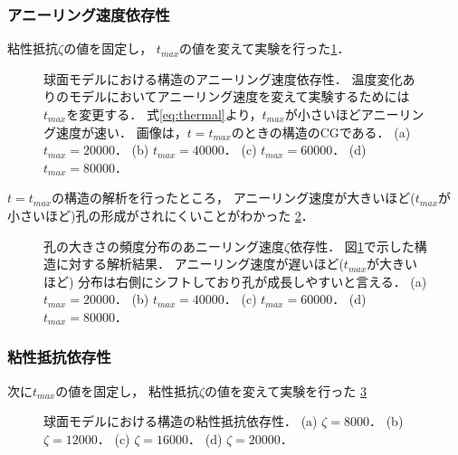\subsubsection{アニーリング速度依存性}

粘性抵抗$\zeta$の値を固定し，
$t_{max}$の値を変えて実験を行った\ref{fig:result_sphere_anearing_speed}．

\begin{figure}
\centering

\caption{
    球面モデルにおける構造のアニーリング速度依存性．
    温度変化ありのモデルにおいてアニーリング速度を変えて実験するためには$t_{max}$を変更する．
    式\ref{eq:thermal}より，$t_{max}$が小さいほどアニーリング速度が速い．
    画像は，$t=t_{max}$のときの構造のCGである．
    (a) $t_{max}=20000$．
    (b) $t_{max}=40000$．
    (c) $t_{max}=60000$．
    (d) $t_{max}=80000$．
}
\label{fig:result_sphere_anearing_speed}
\end{figure}

$t=t_{max}$の構造の解析を行ったところ，
アニーリング速度が大きいほど($t_{max}$が小さいほど)孔の形成がされにくいことがわかった
\ref{fig:result_sphere_anearing_speed_hist}．

\begin{figure}
\centering

\caption{
    孔の大きさの頻度分布のあニーリング速度$\zeta$依存性．
    図\ref{fig:result_sphere_anearing_speed}で示した構造に対する解析結果．
    アニーリング速度が遅いほど($t_{max}$が大きいほど)
    分布は右側にシフトしており孔が成長しやすいと言える．
    (a) $t_{max}=20000$．
    (b) $t_{max}=40000$．
    (c) $t_{max}=60000$．
    (d) $t_{max}=80000$．
}
\label{fig:result_sphere_anearing_speed_hist}
\end{figure}

\subsubsection{粘性抵抗依存性}

次に$t_{max}$の値を固定し，
粘性抵抗$\zeta$の値を変えて実験を行った
\ref{fig:result_sphere_friction_constant}

\begin{figure}
\centering

\caption{
    球面モデルにおける構造の粘性抵抗依存性．
    (a) $\zeta=8000$．
    (b) $\zeta=12000$．
    (c) $\zeta=16000$．
    (d) $\zeta=20000$．
}
\label{fig:result_sphere_friction_constant}
\end{figure}

